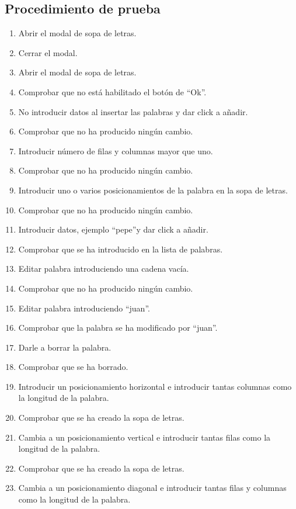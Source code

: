 \subsection{Procedimiento de prueba}
\label{procedimientoPruebas:sopa}
\begin{enumerate}
    \item Abrir el modal de sopa de letras.
    \item Cerrar el modal.
    \item Abrir el modal de sopa de letras.
    \item Comprobar que no está habilitado el botón de ``Ok''. 
    \item No introducir datos al insertar las palabras y dar click a añadir.
    \item Comprobar que no ha producido ningún cambio.
    \item Introducir número de filas y columnas mayor que uno.
    \item Comprobar que no ha producido ningún cambio.
    \item Introducir uno o varios posicionamientos de la palabra en la sopa de letras.
    \item Comprobar que no ha producido ningún cambio.
    \item Introducir datos, ejemplo ``pepe''y dar click a añadir.
    \item Comprobar que se ha introducido en la lista de palabras.
    \item Editar palabra introduciendo una cadena vacía.
    \item Comprobar que no ha producido ningún cambio.
    \item Editar palabra introduciendo ``juan''.
    \item Comprobar que la palabra se ha modificado por ``juan''.
    \item Darle a borrar la palabra.
    \item Comprobar que se ha borrado.
    \item Introducir un posicionamiento horizontal e introducir tantas columnas como la longitud de la palabra.
    \item Comprobar que se ha creado la sopa de letras.
    \item Cambia a un posicionamiento vertical e introducir tantas filas como la longitud de la palabra.
    \item Comprobar que se ha creado la sopa de letras.
    \item Cambia a un posicionamiento diagonal e introducir tantas filas y columnas como la longitud de la palabra.

\end{enumerate}
